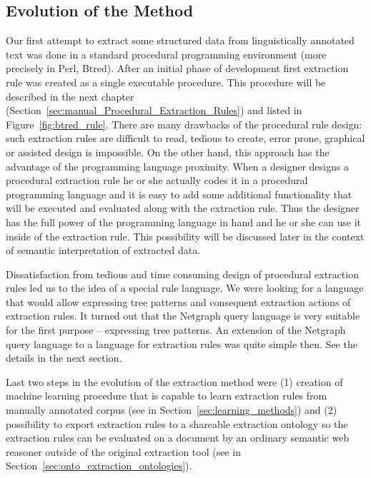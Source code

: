 


\subsection{Evolution of the Method}

Our first attempt to extract some structured data from linguistically annotated text was done in a standard procedural programming environment (more precisely in Perl, Btred). After an initial phase of development first extraction rule was created as a single executable procedure. This procedure will be described in the next chapter (Section~\ref{sec:manual_Procedural_Extraction_Rules}) and listed in Figure~\ref{fig:btred_rule}. There are many drawbacks of the procedural rule design: such extraction rules are difficult to read, tedious to create, error prone, graphical or assisted design is impossible. On the other hand, this approach has the advantage of the programming language proximity. When a designer designs a procedural extraction rule he or she actually codes it in a procedural programming language and it is easy to add some additional functionality that will be executed and evaluated along with the extraction rule. Thus the designer has the full power of the programming language in hand and he or she can use it inside of the extraction rule. This possibility will be discussed later in the context of semantic interpretation of extracted data.

Dissatisfaction from tedious and time consuming design of procedural extraction rules led us to the idea of a special rule language. We were looking for a language that would allow expressing tree patterns and consequent extraction actions of extraction rules. It turned out that the Netgraph query language is very suitable for the first purpose -- expressing tree patterns. An extension of the Netgraph query language to a language for extraction rules was quite simple then. See the details in the next section.

Last two steps in the evolution of the extraction method were (1) creation of machine learning procedure that is capable to learn extraction rules from manually annotated corpus (see in Section~\ref{sec:learning_methods}) and (2) possibility to export extraction rules to a shareable extraction ontology so the extraction rules can be evaluated on a document by an ordinary semantic web reasoner outside of the original extraction tool (see in Section~\ref{sec:onto_extraction_ontologies}).


